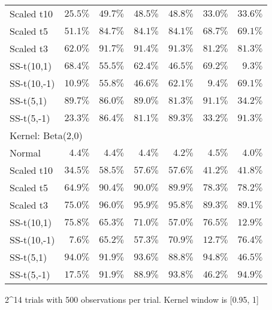 \begin{longtable}{lrrrrrr}
Scaled t10 & $25.5\%$ & $49.7\%$ & $48.5\%$ & $48.8\%$ & $33.0\%$ & $33.6\%$ \\ 
Scaled t5 & $51.1\%$ & $84.7\%$ & $84.1\%$ & $84.1\%$ & $68.7\%$ & $69.1\%$ \\ 
Scaled t3 & $62.0\%$ & $91.7\%$ & $91.4\%$ & $91.3\%$ & $81.2\%$ & $81.3\%$ \\ 
SS-t(10,1) & $68.4\%$ & $55.5\%$ & $62.4\%$ & $46.5\%$ & $69.2\%$ & $9.3\%$ \\ 
SS-t(10,-1) & $10.9\%$ & $55.8\%$ & $46.6\%$ & $62.1\%$ & $9.4\%$ & $69.1\%$ \\ 
SS-t(5,1) & $89.7\%$ & $86.0\%$ & $89.0\%$ & $81.3\%$ & $91.1\%$ & $34.2\%$ \\ 
SS-t(5,-1) & $23.3\%$ & $86.4\%$ & $81.1\%$ & $89.3\%$ & $33.2\%$ & $91.3\%$ \\ 
\midrule
\multicolumn{7}{l}{Kernel: Beta(2,0)} \\ 
\midrule
Normal & $4.4\%$ & $4.4\%$ & $4.4\%$ & $4.2\%$ & $4.5\%$ & $4.0\%$ \\ 
Scaled t10 & $34.5\%$ & $58.5\%$ & $57.6\%$ & $57.6\%$ & $41.2\%$ & $41.8\%$ \\ 
Scaled t5 & $64.9\%$ & $90.4\%$ & $90.0\%$ & $89.9\%$ & $78.3\%$ & $78.2\%$ \\ 
Scaled t3 & $75.0\%$ & $96.0\%$ & $95.9\%$ & $95.8\%$ & $89.3\%$ & $89.1\%$ \\ 
SS-t(10,1) & $75.8\%$ & $65.3\%$ & $71.0\%$ & $57.0\%$ & $76.5\%$ & $12.9\%$ \\ 
SS-t(10,-1) & $7.6\%$ & $65.2\%$ & $57.3\%$ & $70.9\%$ & $12.7\%$ & $76.4\%$ \\ 
SS-t(5,1) & $94.0\%$ & $91.9\%$ & $93.6\%$ & $88.8\%$ & $94.8\%$ & $46.5\%$ \\ 
SS-t(5,-1) & $17.5\%$ & $91.9\%$ & $88.9\%$ & $93.8\%$ & $46.2\%$ & $94.9\%$ \\ 
\bottomrule
\end{longtable}
\begin{minipage}{\linewidth}
2\textasciicircum{}14 trials with 500 observations per trial. Kernel window is [0.95, 1]\\
\end{minipage}

